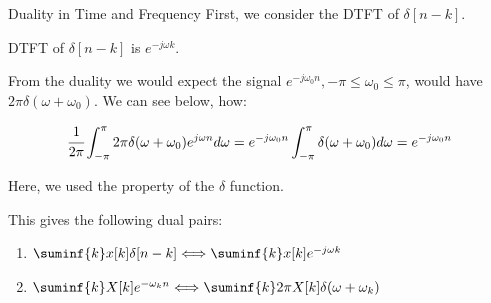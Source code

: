 \documentclass[aspectratio=169,xcolor=dvipsnames,svgnames,x11names,fleqn]{beamer}
\begin{document}
\begin{frame}{}
\vspace*{-9\baselineskip}
    \color{LightGray}{Blank space for calculation}
\end{frame}
\begin{frame}{}
\vspace*{-9\baselineskip}
    \color{LightGray}{Blank space for calculation}
\end{frame}
\begin{frame}{}
\vspace*{-9\baselineskip}
    \color{LightGray}{Blank space for calculation}
\end{frame}
\begin{frame}{}
\vspace*{-9\baselineskip}
    \color{LightGray}{Blank space for calculation}
\end{frame}
\begin{frame}{}
\vspace*{-9\baselineskip}
    \color{LightGray}{Blank space for calculation}
\end{frame}

\begin{frame}{Duality in Time and Frequency}
First, we consider the DTFT of $\delta[n-k]$.


DTFT of $\delta[n-k]$ is $e^{-j\omega k}$.

From the duality we would expect the signal $e^{-j \omega_0 n}, -\pi \leq \omega_0 \leq \pi$, would have $2\pi \delta (\omega + \omega_0)$. We can see below, how:

$$
\cfrac{1}{2\pi } \int_{-\pi}^\pi 2\pi \delta (\omega + \omega_0) e^{j\omega n} d\omega = e^{-j\omega_0 n} \int_{-\pi}^\pi \delta (\omega + \omega_0) d\omega = e^{-j\omega_0 n}
$$

Here, we used the property of the $\delta$ function.

This gives the following dual pairs:

\begin{enumerate}
    \item $\suminf{k} x[k] \delta[n-k] \Longleftrightarrow \suminf{k} x[k]e^{-j\omega k}$
    \item $\suminf{k} X[k]e^{-\omega_k n} \Longleftrightarrow \suminf{k} 2\pi X[k] \delta(\omega + \omega_k)$
\end{enumerate}

\end{frame}
\end{document}
